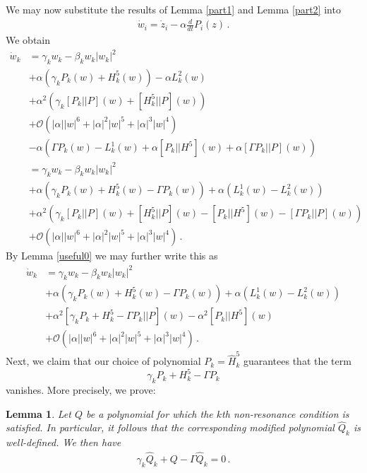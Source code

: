 \documentclass[12pt]{article}
\renewcommand{\mathcal}{\mathscr}
\theoremstyle{plain}
\newtheorem{lem}[thr]{Lemma}
\theoremstyle{definition}
\theoremstyle{remark}
\theoremstyle{remark}
\begin{document}
 We may now substitute the results of Lemma \ref{part1} and Lemma \ref{part2} into
\begin{align}
\dot{w}_i = \dot{z}_i - \alpha \frac{d}{d t}P_i(z) \, .
\end{align}
We obtain
\begin{align}\label{expandedff1}
\dot{w}_k &=  \gamma_kw_k - \beta_k w_k|w_k|^2 \\ \nonumber
    &+  \alpha(\gamma_kP_k(w) + {H}^5_k(w))  - \alpha L^2_k(w) \\ \nonumber
  &+ \alpha^2(\gamma_k[P_k||P](w) + [{H}^5_k|| P](w)) \\ \nonumber
& + \mathcal{O}(|\alpha||w|^6 + |\alpha|^2|w|^5 + |\alpha|^3|w|^4)\\ \nonumber
& - \alpha(\Gamma P_k(w) - L^1_k(w) + \alpha [P_k|| {H}^5](w) + \alpha [\Gamma P_k||P](w)) \\ \nonumber
&=  \gamma_kw_k - \beta_k w_k|w_k|^2 \\ \nonumber
&+  \alpha(\gamma_kP_k(w) + {H}^5_k(w) - \Gamma P_k(w)) + \alpha(L^1_k(w) - L^2_k(w)) \\ \nonumber
&+ \alpha^2(\gamma_k[P_k||P](w) + [{H}^5_k|| P](w) - [P_k|| {H}^5](w) - [\Gamma P_k||P](w)) \\ \nonumber
&+ \mathcal{O}(|\alpha||w|^6 + |\alpha|^2|w|^5 + |\alpha|^3|w|^4)\, . 
\end{align}
By Lemma \ref{useful0} we may further write this as
\begin{align}\label{expandedff2}
\dot{w}_k &=  \gamma_kw_k - \beta_k w_k|w_k|^2 \\ \nonumber
&+  \alpha(\gamma_kP_k(w) + {H}^5_k(w) - \Gamma P_k(w)) + \alpha(L^1_k(w) - L^2_k(w)) \\ \nonumber
&+ \alpha^2[\gamma_kP_k + {H}^5_k - \Gamma P_k||P](w)  - \alpha^2[P_k|| {H}^5](w)  \\ \nonumber
&+ \mathcal{O}(|\alpha||w|^6 + |\alpha|^2|w|^5 + |\alpha|^3|w|^4)\, . 
\end{align}
Next, we claim that our choice of polynomial $P_k = \widehat{H}^5_k$ guarantees that the term
$$\label{solveforalpha}\gamma_kP_k + {H}^5_k - \Gamma P_k$$
vanishes. More precisely, we prove:
\begin{lem}\label{solvinfhomological}
Let $Q$ be a polynomial for which the $k$th non-resonance condition is satisfied. In particular, it follows that the corresponding modified polynomial $\widehat{Q}_k$ is well-defined. We then have 
\begin{align}\label{solveforalpha}\gamma_k\widehat{Q}_k + Q - \Gamma \widehat{Q}_k = 0\,.\end{align}
\end{lem}
\end{document}
